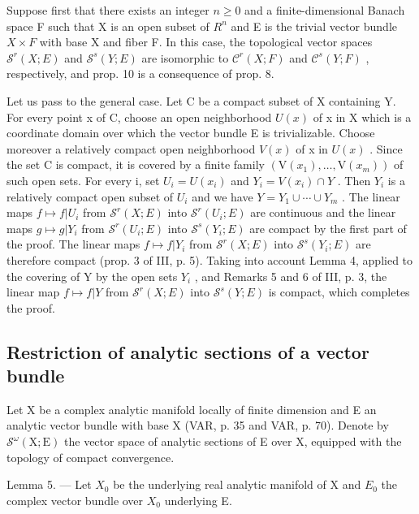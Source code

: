 Suppose first that there exists an integer \(n \geqslant 0\) and a finite-dimensional Banach space F such that X is an open subset of \(R^{n}\) and E is the trivial vector bundle \(X \times F\) with base X and fiber F. In this case, the topological vector spaces \(\mathcal{S}^{r}(X;E)\) and \(\mathcal{S}^{s}(Y;E)\) are isomorphic to \(\mathcal{C}^{r}(X;F)\) and \(\mathcal{C}^{s}(Y;F)\) , respectively, and prop. 10 is a consequence of prop. 8.

Let us pass to the general case. Let C be a compact subset of X containing Y. For every point x of C, choose an open neighborhood \(U(x)\) of x in X which is a coordinate domain over which the vector bundle E is trivializable. Choose moreover a relatively compact open neighborhood \(V(x)\) of x in \(U(x)\) . Since the set C is compact, it is covered by a finite family \((\mathrm{V}(x_{1}),\ldots,\mathrm{V}(x_{m}))\) of such open sets. For every i, set \(U_{i}=U(x_{i})\) and \(Y_{i}=V(x_{i})\cap Y\) . Then \(Y_{i}\) is a relatively compact open subset of \(U_{i}\) and we have \(Y=Y_{1}\cup\cdots\cup Y_{m}\) . The linear maps \(f\mapsto f|U_{i}\) from \(\mathcal{S}^{r}(X;E)\) into \(\mathcal{S}^{r}(U_{i};E)\) are continuous and the linear maps \(g\mapsto g|Y_{i}\) from \(\mathcal{S}^{r}(U_{i};E)\) into \(\mathcal{S}^{s}(Y_{i};E)\) are compact by the first part of the proof. The linear maps \(f\mapsto f|Y_{i}\) from \(\mathcal{S}^{r}(X;E)\) into \(\mathcal{S}^{s}(Y_{i};E)\) are therefore compact (prop. 3 of III, p. 5). Taking into account Lemma 4, applied to the covering of Y by the open sets \(Y_{i}\) , and Remarks 5 and 6 of III, p. 3, the linear map \(f\mapsto f|Y\) from \(\mathcal{S}^{r}(X;E)\) into \(\mathcal{S}^{s}(Y;E)\) is compact, which completes the proof.

\subsection{Restriction of analytic sections of a vector bundle}

Let X be a complex analytic manifold locally of finite dimension and E an analytic vector bundle with base X (VAR, p. 35 and VAR, p. 70). Denote by \(\mathcal{S}^{\omega}(\mathrm{X};\mathrm{E})\) the vector space of analytic sections of E over X, equipped with the topology of compact convergence.

Lemma 5. --- Let \(X_{0}\) be the underlying real analytic manifold of X and \(E_{0}\) the complex vector bundle over \(X_{0}\) underlying E.

